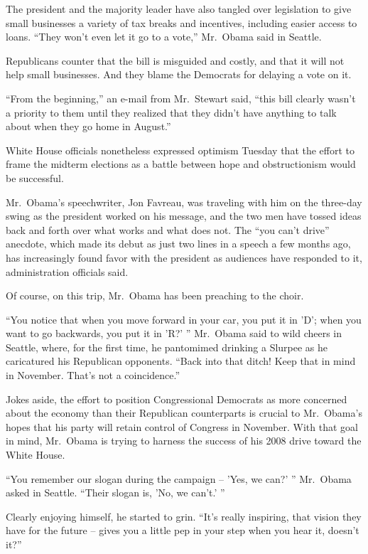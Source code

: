 ﻿\documentclass[12pt]{article}
\begin{document}
The president and the majority leader have also tangled over legislation to give small businesses a
variety of tax breaks and incentives, including easier access to loans. ``They won't even let it go
to a vote,'' Mr.~Obama said in Seattle.

Republicans counter that the bill is misguided and costly, and that it will not help small
businesses. And they blame the Democrats for delaying a vote on it.

``From the beginning,'' an e-mail from Mr.~Stewart said, ``this bill clearly wasn't a priority to
them until they realized that they didn't have anything to talk about when they go home in August.''

White House officials nonetheless expressed optimism Tuesday that the effort to frame the midterm
elections as a battle between hope and obstructionism would be successful.

Mr.~Obama's speechwriter, Jon Favreau, was traveling with him on the three-day swing as the
president worked on his message, and the two men have tossed ideas back and forth over what works
and what does not. The ``you can't drive'' anecdote, which made its debut as just two lines in a
speech a few months ago, has increasingly found favor with the president as audiences have responded
to it, administration officials said.

Of course, on this trip, Mr.~Obama has been preaching to the choir.

``You notice that when you move forward in your car, you put it in 'D'; when you want to go
backwards, you put it in 'R?' '' Mr.~Obama said to wild cheers in Seattle, where, for the first
time, he pantomimed drinking a Slurpee as he caricatured his Republican opponents. ``Back into that
ditch! Keep that in mind in November. That's not a coincidence.''

Jokes aside, the effort to position Congressional Democrats as more concerned about the economy than
their Republican counterparts is crucial to Mr.~Obama's hopes that his party will retain control of
Congress in November. With that goal in mind, Mr.~Obama is trying to harness the success of his 2008
drive toward the White House.

``You remember our slogan during the campaign -- 'Yes, we can?' '' Mr.~Obama asked in Seattle.
``Their slogan is, 'No, we can't.' ''

Clearly enjoying himself, he started to grin. ``It's really inspiring, that vision they have for the
future -- gives you a little pep in your step when you hear it, doesn't it?''
\end{document}

